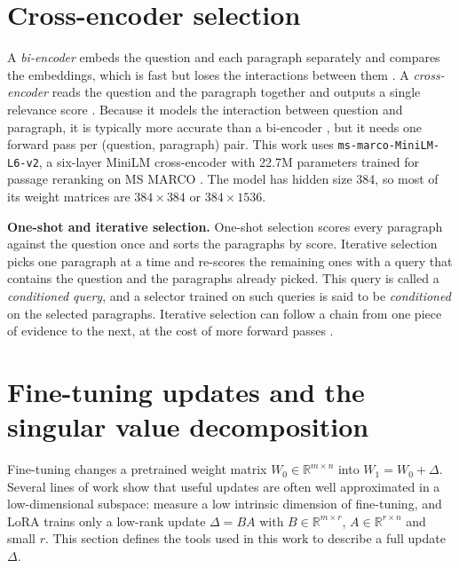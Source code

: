 \section{Cross-encoder selection}
\label{sec:bg_cross}

A \emph{bi-encoder} embeds the question and each paragraph separately and compares the embeddings, which is fast but loses the interactions between them \cite{reimers2019sentence}. A \emph{cross-encoder} reads the question and the paragraph together and outputs a single relevance score \cite{nogueira2019passage,dai2019deeper}. Because it models the interaction between question and paragraph, it is typically more accurate than a bi-encoder \cite{reimers2019sentence}, but it needs one forward pass per (question, paragraph) pair. This work uses \texttt{ms-marco-MiniLM-L6-v2}, a six-layer MiniLM \cite{wang2020minilm} cross-encoder with 22.7M parameters trained for passage reranking on MS MARCO \cite{bajaj2016msmarco}. The model has hidden size 384, so most of its weight matrices are $384\times384$ or $384\times1536$.

\textbf{One-shot and iterative selection.} One-shot selection scores every paragraph against the question once and sorts the paragraphs by score. Iterative selection picks one paragraph at a time and re-scores the remaining ones with a query that contains the question and the paragraphs already picked. This query is called a \emph{conditioned query}, and a selector trained on such queries is said to be \emph{conditioned} on the selected paragraphs. Iterative selection can follow a chain from one piece of evidence to the next, at the cost of more forward passes \cite{xiong2021mdr,zhang2024beamretrieval}.

\section{Fine-tuning updates and the singular value decomposition}
\label{sec:bg_svd}

Fine-tuning changes a pretrained weight matrix $W_0 \in \mathbb{R}^{m \times n}$ into $W_1 = W_0 + \Delta$. Several lines of work show that useful updates are often well approximated in a low-dimensional subspace:  measure a low intrinsic dimension of fine-tuning, and LoRA \cite{hu2022lora} trains only a low-rank update $\Delta = BA$ with $B \in \mathbb{R}^{m \times r}$, $A \in \mathbb{R}^{r \times n}$ and small $r$. This section defines the tools used in this work to describe a full update $\Delta$.

